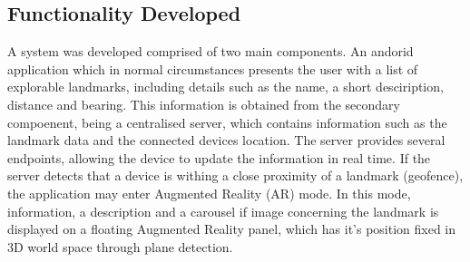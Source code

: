 \subsection{Functionality Developed}
A system was developed comprised of two main components. An andorid application which in normal circumstances presents the user with a list of explorable landmarks, including 
details such as the name, a short desciription, distance and bearing. This information is obtained from the secondary compoenent, being a centralised server, which contains information 
such as the landmark data and the connected devices location. The server provides several endpoints, allowing the device to update the information in real time. If the server detects that 
a device is withing a close proximity of a landmark (geofence), the application may enter Augmented Reality (AR) mode. In this mode, information, a description and a carousel if image 
concerning the landmark is displayed on a floating Augmented Reality panel, which has it's position fixed in 3D world space through plane detection. 
